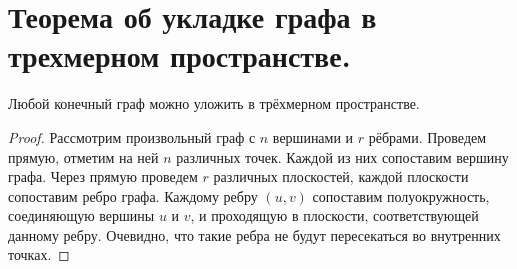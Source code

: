 \section{Теорема об укладке графа в трехмерном пространстве.}

\begin{theorem}
    Любой конечный граф можно уложить в трёхмерном пространстве.
\end{theorem}

\begin{proof}
    Рассмотрим произвольный граф с $n$ вершинами и $r$ рёбрами.
    Проведем прямую, отметим на ней $n$ различных точек. Каждой из них
    сопоставим вершину графа. Через прямую проведем $r$ различных плоскостей,
    каждой плоскости сопоставим ребро графа. Каждому ребру $(u,v)$ сопоставим
    полуокружность, соединяющую вершины $u$ и $v$, и проходящую в плоскости,
    соответствующей данному ребру. Очевидно, что такие ребра не будут
    пересекаться во внутренних точках.
\end{proof}